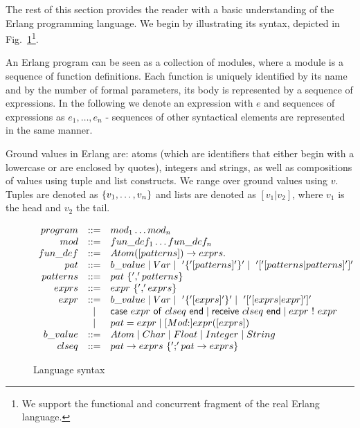 \documentclass{article}[12pt,a4paper]
\theoremstyle{definition}
\newcommand{\cons}{\mbox{:}}
\begin{document}
The rest of this section provides the reader with a basic understanding
of the Erlang programming language. We begin by illustrating its syntax, depicted in
Fig.~\ref{ErlangSyntax}\footnote{We support the functional and concurrent fragment of the
  real Erlang language.}. 

An Erlang program can be seen as a collection of modules, where a module is a sequence of function definitions. Each function is uniquely identified by its name and by the
number of formal parameters, its body is represented
by a sequence of expressions. In the following we denote an expression with $e$
and sequences of expressions as $e_1,\ldots,e_n$  - sequences of other
syntactical elements are represented in the same manner. 

Ground values in Erlang are: atoms (which are identifiers that either
begin with a lowercase or are enclosed by quotes), integers and
strings, as well as compositions of values using tuple and list
constructs. We range over ground values using $v$. Tuples are denoted
as $\mathsf{\{}v_1,\ldots,v_n\mathsf{\}}$ and lists are denoted as
$[v_1|v_2]$, where $v_1$ is the head and $v_2$ the tail.


\begin{figure}[t]
  \begin{center}
    $
    \begin{array}{rcl@{~~~~~~}l}

      program & ::= & mod_1  \dots  mod_n \\
      mod & ::= & fun\_def_1  \dots fun\_def_n  \\
      fun\_def & ::= & Atom([patterns]) \to exprs.\\
      pat & ::= & b\_value \mid Var \mid ~'\{'[patterns]'\}' \mid ~
                  '['[patterns|patterns] ']'\\
      patterns & ::= & pat ~\{ ','patterns\} \\
      exprs & ::= & expr ~\{ ',' exprs\} \\
      expr & ::= & b\_value \mid Var \mid ~'\{'[exprs]'\}' \mid ~'[' [exprs|expr] ']' \\
                    & \mid & \ms{case}~expr~\ms{of}~clseq~\mathsf{end} \mid
                             \ms{receive}~clseq~\mathsf{end} \mid expr ~ ! ~ expr \\
                    & \mid & pat = expr \mid
                             [Mod\cons]expr([exprs]) \\
      b\_value & ::= & Atom \mid Char \mid Float \mid Integer \mid String \\
      clseq & ::= & pat  \to exprs ~ \{ ';' pat \to exprs  \} \\
    \end{array}
    $
  \end{center}
  \caption{Language syntax} \label{ErlangSyntax}
\end{figure}
\end{document}
